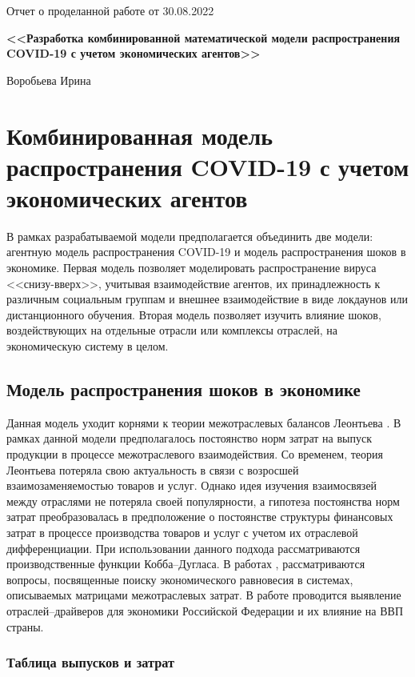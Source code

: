 \documentclass[12pt, a4paper]{article}
\begin{document}
\begin{center}
Отчет о проделанной работе от 30.08.2022

\textbf{<<Разработка комбинированной математической модели распространения COVID-19 с учетом экономических агентов>>}

Воробьева Ирина
\end{center}
\section{Комбинированная модель распространения COVID-19 с учетом экономических агентов}

В рамках разрабатываемой модели предполагается объединить две модели: агентную модель распространения COVID-19 и модель распространения шоков в экономике. Первая модель позволяет моделировать распространение вируса <<снизу-вверх>>, учитывая взаимодействие агентов, их принадлежность к различным социальным группам и внешнее взаимодействие в виде локдаунов или дистанционного обучения. Вторая модель позволяет изучить влияние шоков, воздействующих на отдельные отрасли или комплексы отраслей, на экономическую систему в целом.

\subsection{Модель распространения шоков в экономике}
Данная модель уходит корнями к теории межотраслевых балансов Леонтьева \cite{Leontev}. В рамках данной модели предполагалось постоянство норм затрат на выпуск продукции в процессе межотраслевого взаимодействия. Со временем, теория Леонтьева потеряла свою актуальность в связи с возросшей взаимозаменяемостью товаров и услуг. Однако идея изучения взаимосвязей между отраслями не потеряла своей популярности, а гипотеза постоянства норм затрат преобразовалась в предположение о постоянстве структуры финансовых затрат в процессе производства товаров и услуг с учетом их отраслевой дифференциации. При использовании данного подхода рассматриваются производственные функции Кобба--Дугласа. В работах \cite{Inverse_Shan}, \cite{Duality_Shan} рассматриваются вопросы, посвященные поиску экономического равновесия в системах, описываемых матрицами межотраслевых затрат. В работе \cite{Akimova} проводится выявление отраслей--драйверов для экономики Российской Федерации и их влияние на ВВП страны.

\subsubsection{Таблица выпусков и затрат}
\end{document}
